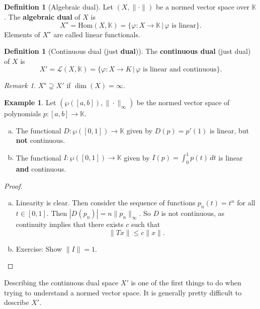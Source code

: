 \documentclass[justified]{tufte-book}
\theoremstyle{plain}%
\theoremstyle{definition}
\newtheorem{defn}[thm]{Definition}
\newtheorem{exmp}[thm]{Example}
\theoremstyle{remark}
\newtheorem*{rem}{Remark}
\newcommand{\K}{\mathbb{K}}
\renewcommand{\phi}{\varphi}
\begin{document}
\begin{defn}[Algebraic dual]
  Let $(X, \| \cdot \|)$ be a normed vector space over $\K$.  The \textbf{algebraic dual} of $X$ is \[
      X^\star = \text{Hom}(X, \K) = \{ \phi: X \rightarrow \K \, | \, \text{$\phi$ is linear} \}.
  \]  Elements of $X^\star$ are called linear functionals.
\end{defn}

\begin{defn}[Continuous dual (just \textbf{dual})]
  The \textbf{continuous dual} (just dual) of $X$ is \[
      X' = \mathcal{L}(X, \K) = \{ \phi : X \rightarrow K \, | \, \text{$\phi$ is linear and continuous} \}.
  \]
\end{defn}

\begin{rem}
  $X^\star \supsetneq X'$ if $\dim(X) = \infty$.
\end{rem}

\begin{exmp}
  Let $(\wp([a,b]), \| \cdot \|_\infty)$ be the normed vector space of polynomials $p: [a,b] \rightarrow \K$.                 
  \begin{enumerate}[(a)]
      \item The functional $D : \wp([0,1]) \rightarrow \K$ given by $D(p) = p'(1)$ is linear, but \textbf{not} continuous.
      \item The functional $I: \wp([0,1]) \rightarrow \K$ given by $I(p) = \int_0^1 p(t) \, dt$ is linear \textbf{and} continuous.
  \end{enumerate}
\end{exmp}

\begin{proof}
\begin{enumerate}[(a)]
      \item Linearity is clear.  Then consider the sequence of functions $p_n(t) = t^n$ for all $t \in [0,1]$.  Then $|D(p_n)| =   n \| p_n \|_\infty$.  So $D$ is not continuous, as continuity implies that there exists $c$ such that \[
          \| Tx \| \leq c \| x \|.
      \]
      \item Exercise: Show $\| I \| = 1$.
\end{enumerate}
\end{proof}

Describing the continuous dual space $X'$ is one of the first things to do when trying to understand a normed vector space.  It is generally pretty difficult to describe $X'$.
\end{document}
